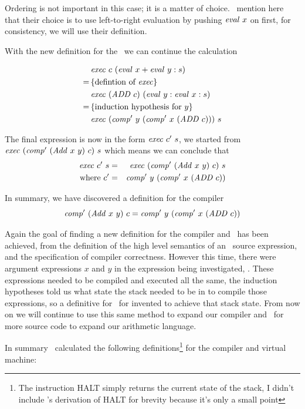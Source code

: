 \documentclass {article}
\begin{document}
Ordering is not important in this case; it is a matter of choice.
\BH\ mention here that their choice is to use
left-to-right evaluation by pushing $\mathit{eval\ } x$ on first,
for consistency, we will use their definition.

With the new definition for the 
\exec\ we can continue the calculation 

\begin{align*}
&\mathit{exec\ } c\ (\mathit{eval\ } x + \mathit{eval\ } y :s) \\
=\, & \{ \mbox{defintion of \textit{exec}}\} \\
&\mathit{exec\ } (\mathit{ADD\ } c)\ (\mathit{eval\ }  y : \mathit{eval\ }  x : s) \\
=\, & \{ \mbox{induction hypothesis for}\  y \} \\
&\mathit{exec\ } (\mathit{comp'\ } y\ (\mathit{comp'\ } x\ (\mathit{ADD\ } c)))\ s
\end{align*}

The final expression is now in the form
\( \mathit{exec\ } c'\ s \), we started from
\( \mathit{exec\ } (\mathit{comp'\ }  (\mathit{Add\ } x\ y)\ c)\ s \)
which means we can conclude that 
\begin{eqnarray*}
\mathit{exec\ } c'\ s &=& \mathit{exec\ } (\mathit{comp'\ }  (\mathit{Add\ } x\ y)\ c)\ s \\
\mbox{where}\ c' &=& \mathit{comp'\ } y\ (\mathit{comp'\ } x\ (\mathit{ADD\ } c))
\end{eqnarray*}

In summary, we have discovered a definition for the
compiler
\begin{equation*}
\mathit{comp'\ }  (\mathit{Add\ } x\ y)\ c
= \mathit{comp'\ } y\ (\mathit{comp'\ } x\ (\mathit{ADD\ } c))
\end{equation*}

Again the goal of finding a new definition for the
compiler and \vm\ has been achieved,
from the definition of the high level semantics 
of an \add\ source expression, and the specification 
of compiler correctness.
However this time, there were argument expressions
$x$ and $y$ in the expression being investigated, \add.
These expressions needed to be compiled and executed
all the same, the
induction hypotheses told us what state the stack needed
to be in to compile those expressions,
so a definitive for \exec\ for invented to achieve that stack state.
From now on we will continue to use this same method to
expand our compiler and \vm\ for more 
source code to expand our arithmetic language.

\newcommand{\HALTt}{\textit{HALT}}
\newcommand{\Stack}{\textit{Stack\ }}
\newcommand{\HALT}{\mathit{HALT}}

In summary \BH\ calculated the following definitions\footnote{
The instruction HALT simply returns the current state of the stack,
I didn't include \BH's derivation of HALT for brevity because
it's only a small point}
for the compiler and virtual machine:
\end{document}
